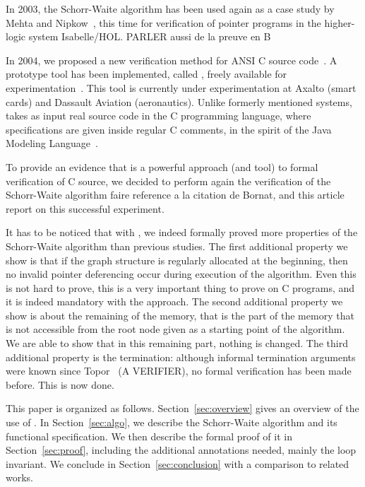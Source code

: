 In 2003, the Schorr-Waite algorithm has been used again as a case
study by Mehta and Nipkow~\cite{mehta03cade}, this time for
verification of pointer programs in the higher-logic system
Isabelle/HOL. PARLER aussi de la preuve en B

In 2004, we proposed a new verification method for ANSI
C source code~\cite{filliatre04icfem}.  A prototype tool has been
implemented, called \caduceus{}, freely available for
experimentation~\cite{Caduceus}. This tool is currently under
experimentation at Axalto (smart cards) and Dassault Aviation
(aeronautics). Unlike formerly mentioned systems, \caduceus{} takes as
input real source code in the C programming language, where
specifications are given inside regular C comments, in the spirit of
the Java Modeling Language~\cite{leavens00jml}. 

To provide an evidence that \caduceus{} is a powerful approach (and
tool) to formal verification of C source, we decided to perform again
the verification of the Schorr-Waite algorithm {\huge faire reference
  a la citation de Bornat}, and this article report
on this successful experiment.

It has to be noticed that with \caduceus{}, we indeed formally proved
more properties of the Schorr-Waite algorithm than previous studies.
The first additional property we show is that if the graph structure
is regularly allocated at the beginning, then no invalid pointer
deferencing occur during execution of the algorithm. Even this is not
hard to prove, this is a very important thing to prove on C programs,
and it is indeed mandatory with the \caduceus{} approach. The second
additional property we show is about the remaining of the memory, that
is the part of the memory that is not accessible from the root node
given as a starting point of the algorithm. We are able to show that
in this remaining part, nothing is changed. The third additional
property is the termination: although informal termination arguments
were known since Topor~\cite{topor79acta} (A VERIFIER), no formal
verification has been made before. This is now done.

This paper is organized as follows.  Section~\ref{sec:overview} gives
an overview of the use of \caduceus{}.  In Section~\ref{sec:algo}, we
describe the Schorr-Waite algorithm and its functional specification.
We then describe the formal proof of it in Section~\ref{sec:proof},
including the additional annotations needed, mainly the loop
invariant.  We conclude in Section~\ref{sec:conclusion} with a
comparison to related works.





